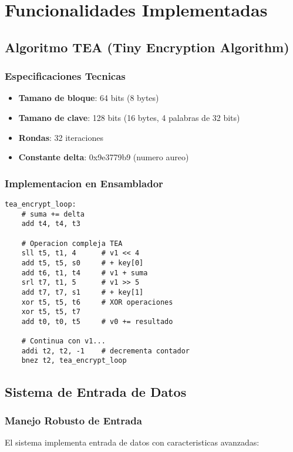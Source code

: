 \documentclass[12pt,a4paper]{article}
\begin{document}
\section{Funcionalidades Implementadas}

\subsection{Algoritmo TEA (Tiny Encryption Algorithm)}

\subsubsection{Especificaciones Tecnicas}
\begin{itemize}
\item \textbf{Tamano de bloque}: 64 bits (8 bytes)
\item \textbf{Tamano de clave}: 128 bits (16 bytes, 4 palabras de 32 bits)
\item \textbf{Rondas}: 32 iteraciones
\item \textbf{Constante delta}: 0x9e3779b9 (numero aureo)
\end{itemize}

\subsubsection{Implementacion en Ensamblador}
\begin{lstlisting}[caption=Bucle Principal TEA]
tea_encrypt_loop:
    # suma += delta
    add t4, t4, t3
    
    # Operacion compleja TEA
    sll t5, t1, 4      # v1 << 4
    add t5, t5, s0     # + key[0]
    add t6, t1, t4     # v1 + suma
    srl t7, t1, 5      # v1 >> 5
    add t7, t7, s1     # + key[1]
    xor t5, t5, t6     # XOR operaciones
    xor t5, t5, t7
    add t0, t0, t5     # v0 += resultado
    
    # Continua con v1...
    addi t2, t2, -1    # decrementa contador
    bnez t2, tea_encrypt_loop
\end{lstlisting}

\subsection{Sistema de Entrada de Datos}

\subsubsection{Manejo Robusto de Entrada}
El sistema implementa entrada de datos con caracteristicas avanzadas:
\end{document}
